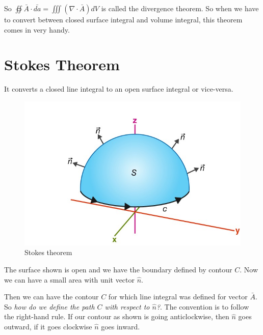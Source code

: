 So $\oiint \bar{A} \cdot \bar{da} = \iiint (\nabla \cdot \bar{A})dV$ is called the divergence theorem. So when we have to convert between closed surface integral and volume integral, this theorem comes in very handy.

\section{Stokes Theorem}
It converts a closed line integral to an open surface integral or vice-versa.


\begin{figure}
\centering
\includegraphics[width=0.7\linewidth]{./graphics/fig17.8}
\caption{Stokes theorem}
\end{figure}


The surface shown is open and we have the boundary defined by contour $C$. Now we can have a small area with unit vector $\hat n$.

Then we can have the contour $C$ for which line integral was defined for vector $\bar{A}$. So \emph{how do we define the path $C$ with respect to $\hat{n}$?}. The convention is to follow the right-hand rule. If our contour as shown is going anticlockwise, then $\hat n$ goes outward, if it goes clockwise $\hat n$ goes inward.

